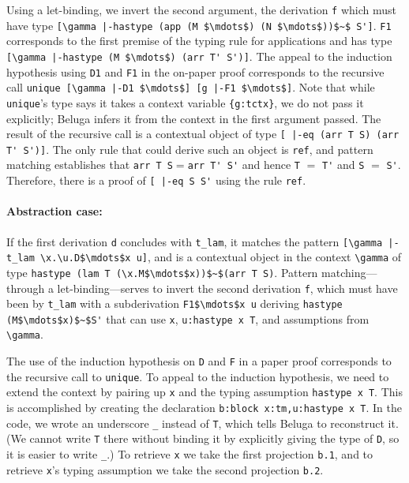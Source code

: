 Using a let-binding, we invert the second
argument, the derivation \lstinline{f} which 
must have type
\lstinline![\gamma |-hastype (app (M $\mdots$) (N $\mdots$))$~$ S']!. \lstinline!F1!
corresponds to the first premise of the typing rule for applications
and has type \lstinline![\gamma |-hastype (M $\mdots$) (arr T' S')]!.
The appeal to the induction hypothesis using \lstinline{D1} and \lstinline{F1} in the
on-paper proof 
corresponds to the recursive call
 \lstinline!unique [\gamma |-D1 $\mdots$] [g |-F1 $\mdots$]!.
Note that while \lstinline{unique}'s type says it takes a context variable \lstinline!{g:tctx}!,
we do not pass it explicitly; Beluga infers it from the context in the first argument
passed. 
The result of the recursive call is a contextual object of type 
\lstinline![ |-eq (arr T S) (arr T' S')]!. The only rule that
could derive such an object is \lstinline{ref}, and pattern matching
establishes that \lstinline!arr T S!$=$\lstinline!arr T' S'! and hence
\lstinline!T! $=$ \lstinline!T'! and \lstinline!S! $=$ \lstinline!S'!.
Therefore, there is a proof of \lstinline![ |-eq S S'! using the
rule \lstinline!ref!.

 \paragraph{Abstraction case:}
  If the first derivation \lstinline{d} concludes with \lstinline{t_lam}, it matches
 the pattern \lstinline{[\gamma |-t_lam \x.\u.D$\mdots$x u]}, and is
 a contextual object in the context \lstinline!\gamma! of type 
 \lstinline{hastype (lam T (\x.M$\mdots$x))$~$(arr T S)}.
 Pattern matching---through a let-binding---serves to invert the second derivation \lstinline{f}, which
 must have been by \lstinline{t_lam} with a subderivation
 \lstinline{F1$\mdots$x u} deriving \lstinline{hastype (M$\mdots$x)$~$S'} that can use \lstinline{x},
 \lstinline{u:hastype x T}, and assumptions from \lstinline!\gamma!.

 The use of the induction hypothesis on \lstinline{D} and \lstinline{F} in a paper proof
 corresponds to the recursive call to \lstinline{unique}.  To appeal to the
 induction hypothesis, we need to extend the context by pairing up \lstinline{x} and
 the typing assumption \lstinline!hastype x T!. This is accomplished by creating
 the declaration \lstinline!b:block x:tm,u:hastype x T!.  In the
 code, we wrote an underscore \lstinline!_! instead of \lstinline{T},
 which tells Beluga to reconstruct it.  (We cannot write \lstinline{T} there without binding it by
 explicitly giving the type of \lstinline{D}, so it is easier to write \lstinline!_!.)
 To retrieve \lstinline{x} we take the first projection
 \lstinline{b.1}, and to retrieve \lstinline{x}'s typing assumption we take the second projection \lstinline{b.2}.
 

